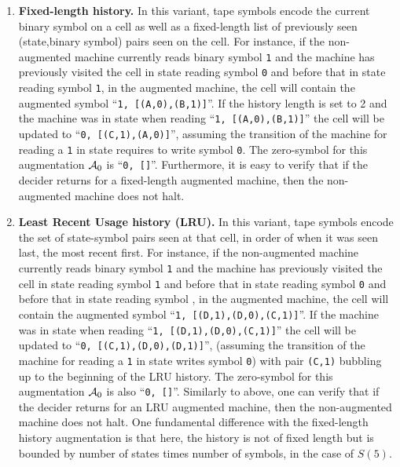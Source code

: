 \begin{enumerate}
    \item \textbf{Fixed-length history.} In this variant, tape symbols encode the current binary symbol on a cell as well as a fixed-length list of previously seen (state,binary symbol) pairs seen on the cell. For instance, if the non-augmented machine currently reads binary symbol \texttt{1} and the machine has previously visited the cell in state \stateA reading symbol \texttt{0} and before that in state \stateB reading symbol \texttt{1}, in the augmented machine, the cell will contain the augmented symbol ``\texttt{1, [(A,0),(B,1)]}''. If the history length is set to 2 and the machine was in state \stateC when reading ``\texttt{1, [(A,0),(B,1)]}'' the cell will be updated to ``\texttt{0, [(C,1),(A,0)]}'', assuming the transition of the machine for reading a \texttt{1} in state \stateC requires to write symbol \texttt{0}. The zero-symbol for this augmentation $\mathcal{A}_0$ is ``\texttt{0, []}''. Furthermore, it is easy to verify that if the decider returns \NONHALT for a fixed-length augmented machine, then the non-augmented machine does not halt.
    \item \textbf{Least Recent Usage history (LRU).} In this variant, tape symbols encode the set of state-symbol pairs seen at that cell,
          in order of when it was seen last, the most recent first.  For instance, if the non-augmented machine currently reads binary symbol \texttt{1} and the machine has previously visited the cell in state \stateD reading symbol \texttt{1} and before that in state \stateD reading symbol \texttt{0} and before that in state \stateC reading symbol \sone, in the augmented machine, the cell will contain the augmented symbol ``\texttt{1, [(D,1),(D,0),(C,1)]}''. If the machine was in state \stateC when reading ``\texttt{1, [(D,1),(D,0),(C,1)]}'' the cell will be updated to ``\texttt{0, [(C,1),(D,0),(D,1)]}'', (assuming the transition of the machine for reading a \texttt{1} in state \stateC writes symbol \texttt{0}) with pair \texttt{(C,1)} bubbling up to the beginning of the LRU history. The zero-symbol for this augmentation $\mathcal{A}_0$ is also ``\texttt{0, []}''. Similarly to above, one can verify that if the decider returns \NONHALT for an LRU augmented machine, then the non-augmented machine does not halt. One fundamental difference with the fixed-length history augmentation is that here, the history is not of fixed length but is bounded by number of states times number of symbols,  in the case of $S(5)$.
\end{enumerate}

